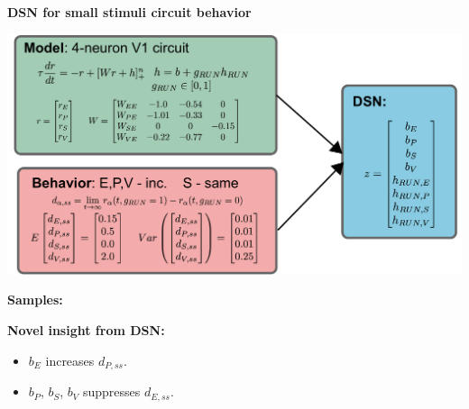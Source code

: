 \documentclass[landscape]{article}
\begin{document}
\begin{multicols*}{4}
\begin{multicols*}{2}
\end{multicols*}

\columnbreak

{\bf\huge DSN for small stimuli circuit behavior} \\
\vspace{-.75in}
\begin{center}
\includegraphics[scale=1.0]{figs/V1_DSN.pdf} \\
\end{center}

\begin{multicols*}{2}
{\bf\huge Samples:} \\
\vspace{-1.75in}
\begin{center}
\end{center}

\columnbreak
\begin{mybox}
{\bf\huge Novel insight from DSN:} \\
\begin{itemize}
\item $b_E$ increases $d_{P,ss}$.
\begin{center}
\end{center}
\item $b_P$, $b_S$, $b_V$ suppresses $d_{E,ss}$.
\begin{center}
\end{center}
\end{itemize}
\end{mybox}
\end{multicols*}


\end{multicols*}
\end{document}
